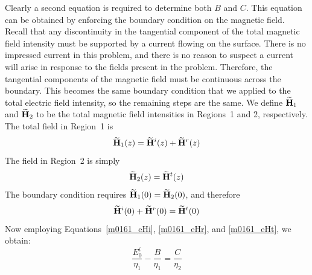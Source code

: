 Clearly a second equation is required to determine both $B$ and $C$.
This equation can be obtained by enforcing the boundary condition on the magnetic field.  
Recall that any discontinuity in the tangential component of the total magnetic field intensity must be supported by a current flowing on the surface.
There is no impressed current in this problem, and there is no reason to suspect a current will arise in response to the fields present in the problem.
Therefore, the tangential components of the magnetic field must be continuous across the boundary.
This becomes the same boundary condition that we applied to the total electric field intensity, so the remaining steps are the same.
We define $\widetilde{\bf H}_1$ and $\widetilde{\bf H}_2$ to be the total magnetic field intensities in Regions~1 and 2, respectively.
The total field in Region~1 is
%
\begin{equation}
\widetilde{\bf H}_1(z) = \widetilde{\bf H}^i(z) + \widetilde{\bf H}^r(z)
\end{equation}
%
The field in Region~2 is simply
%
\begin{equation}
\widetilde{\bf H}_2(z) = \widetilde{\bf H}^t(z)
\end{equation}
%
The boundary condition requires $\widetilde{\bf H}_1(0)=\widetilde{\bf H}_2(0)$, and therefore
%
\begin{equation}
\widetilde{\bf H}^i(0) + \widetilde{\bf H}^r(0)  = \widetilde{\bf H}^t(0) %
\end{equation}
%
Now employing Equations~\ref{m0161_eHi}, \ref{m0161_eHr}, and \ref{m0161_eHt}, we obtain:
%
\begin{equation}
\frac{E_0^i}{\eta_1} - \frac{B}{\eta_1} = \frac{C}{\eta_2}
\label{m0161_eBCH}
\end{equation}

